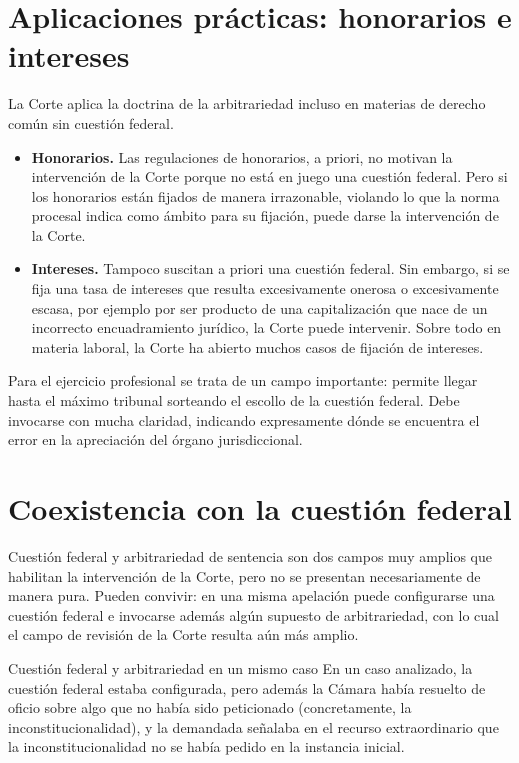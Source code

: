 \documentclass[12pt,oneside]{book}
\begin{document}
\section{Aplicaciones prácticas: honorarios e intereses}

La Corte aplica la doctrina de la arbitrariedad incluso en materias de derecho común sin cuestión federal.

\begin{itemize}
    \item \textbf{Honorarios.} Las regulaciones de honorarios, a priori, no motivan la intervención de la Corte porque no está en juego una cuestión federal. Pero si los honorarios están fijados de manera irrazonable, violando lo que la norma procesal indica como ámbito para su fijación, puede darse la intervención de la Corte.
    \item \textbf{Intereses.} Tampoco suscitan a priori una cuestión federal. Sin embargo, si se fija una tasa de intereses que resulta excesivamente onerosa o excesivamente escasa, por ejemplo por ser producto de una capitalización que nace de un incorrecto encuadramiento jurídico, la Corte puede intervenir. Sobre todo en materia laboral, la Corte ha abierto muchos casos de fijación de intereses.
\end{itemize}

\begin{note}
Para el ejercicio profesional se trata de un campo importante: permite llegar hasta el máximo tribunal sorteando el escollo de la cuestión federal. Debe invocarse con mucha claridad, indicando expresamente dónde se encuentra el error en la apreciación del órgano jurisdiccional.
\end{note}

\section{Coexistencia con la cuestión federal}

Cuestión federal y arbitrariedad de sentencia son dos campos muy amplios que habilitan la intervención de la Corte, pero no se presentan necesariamente de manera pura. Pueden convivir: en una misma apelación puede configurarse una cuestión federal e invocarse además algún supuesto de arbitrariedad, con lo cual el campo de revisión de la Corte resulta aún más amplio.

\begin{example}{Cuestión federal y arbitrariedad en un mismo caso}
En un caso analizado, la cuestión federal estaba configurada, pero además la Cámara había resuelto de oficio sobre algo que no había sido peticionado (concretamente, la inconstitucionalidad), y la demandada señalaba en el recurso extraordinario que la inconstitucionalidad no se había pedido en la instancia inicial.
\end{example}
\end{document}
